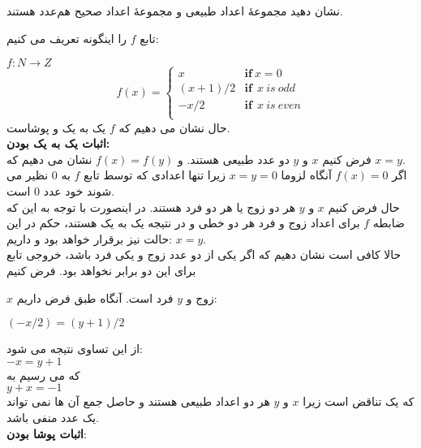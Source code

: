 
نشان دهید مجموعهٔ اعداد طبیعی و مجموعهٔ اعداد صحیح هم‌عدد هستند.
\begin{ans}
    تابع 
    $f$
    را اینگونه تعریف می کنیم:

    $f:N\xrightarrow{} Z$
    \[
    f(x) = 
    \begin{cases}
        x & \textbf{if} \ x = 0\\
        (x+1)/2 & \textbf{if} \ \ x \ is \ odd\\
        -x/2 & \textbf{if} \ \ x \ is \ even\\
    \end{cases}
    \]
    حال نشان می دهیم که 
    $f$
    یک به یک و پوشاست.
    \\
    \textbf{اثبات یک به یک بودن:}\\
    فرض کنیم 
    $x$
    و
    $y$
    دو عدد طبیعی هستند. و 
    $f(x) = f(y)$
    نشان می دهیم که 
    $x = y$.
    \\
    اگر 
    $f(x) = 0$
    آنگاه لزوما
    $x = y = 0$
    زیرا تنها اعدادی که توسط تابع 
    $f$
    به 
    $0$
    نظیر می شوند خود عدد 
    $0$
    است.
    \\
    حال فرض کنیم 
    $x$
    و
    $y$
    هر دو زوج یا هر دو فرد هستند. در اینصورت با توجه به این که ضابطه 
    $f$
    برای اعداد زوج و فرد هر دو خطی و در نتیجه یک به یک هستند، حکم در این حالت نیز برقرار خواهد بود و داریم:
    $x = y$.
    \\
    حالا کافی است نشان دهیم که اگر یکی از دو عدد زوج و یکی فرد باشد، خروجی تابع برای این دو برابر نخواهد بود. فرض کنیم 
    
    $x$
    زوج و
    $y$
    فرد است. آنگاه طبق فرض داریم:

    $(-x/2) = (y+1)/2$

    از این تساوی نتیجه می شود:\\
    $-x = y+1$
    \\
    که می رسیم به
    \\
    $y+x = -1$
    \\
    که یک تناقض است زیرا
    $x$
    و
    $y$
    هر دو اعداد طبیعی هستند و حاصل جمع آن ها نمی تواند یک عدد منفی باشد.
    \\
    \textbf{اثبات پوشا بودن}:\\


\end{ans}
